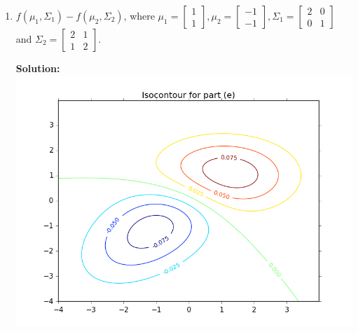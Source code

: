 \documentclass{article}
\newcommand{\solution}{\textbf{Solution: }}
\begin{document}
\begin{enumerate}[label=(\alph*)]
    \newpage
    \item $f(\mu_1, \Sigma_1) - f(\mu_2, \Sigma_2)$, where $\mu_1 = \begin{bmatrix} 1 \\ 1 \end{bmatrix}, \mu_2 = \begin{bmatrix} -1 \\ -1 \end{bmatrix}, \Sigma_1 = \begin{bmatrix} 2 & 0 \\ 0 & 1 \end{bmatrix}$ and $\Sigma_2 = \begin{bmatrix} 2 & 1 \\ 1 & 2 \end{bmatrix}$.
    \begin{mdframed} \solution\\
    \includegraphics[scale=.75]{images/isocontour_e.png}
    \end{mdframed}
    
\end{enumerate}

\newpage
\end{document}
